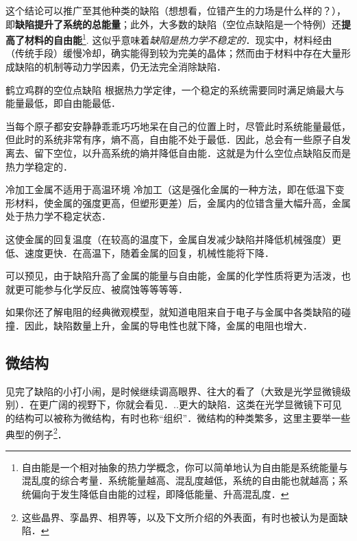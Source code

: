 这个结论可以推广至其他种类的缺陷（想想看，位错产生的力场是什么样的？），即\textbf{缺陷提升了系统的总能量}；此外，大多数的缺陷（空位点缺陷是一个特例）还\textbf{提高了材料的自由能}\footnote{自由能是一个相对抽象的热力学概念，你可以简单地认为自由能是系统能量与混乱度的综合考量．系统能量越高、混乱度越低，系统的自由能也就越高；系统偏向于发生降低自由能的过程，即降低能量、升高混乱度．}. 这似乎意味着\textsl{缺陷是热力学不稳定的}．现实中，材料经由（传统手段）缓慢冷却，确实能得到较为完美的晶体；然而由于材料中存在大量形成缺陷的机制等动力学因素，仍无法完全消除缺陷．

\begin{example}{鹤立鸡群的空位点缺陷}
根据热力学定律，一个稳定的系统需要同时满足熵最大与能量最低，即自由能最低．

当每个原子都安安静静乖乖巧巧地呆在自己的位置上时，尽管此时系统能量最低，但此时的系统非常有序，熵不高，自由能不处于最低．因此，总会有一些原子自发离去、留下空位，以升高系统的熵并降低自由能．这就是为什么空位点缺陷反而是热力学稳定的．
\end{example}

\begin{example}{冷加工金属不适用于高温环境}
冷加工（这是强化金属的一种方法，即在低温下变形材料，使金属的强度更高，但塑形更差）后，金属内的位错含量大幅升高，金属处于热力学不稳定状态．

这使金属的回复温度（在较高的温度下，金属自发减少缺陷并降低机械强度）更低、速度更快．在高温下，随着金属的回复，机械性能将下降．
\end{example}

可以预见，由于缺陷升高了金属的能量与自由能，金属的化学性质将更为活泼，也就更可能参与化学反应、被腐蚀等等等等．

如果你还了解电阻的经典微观模型，就知道电阻来自于电子与金属中各类缺陷的碰撞．因此，缺陷数量上升，金属的导电性也就下降，金属的电阻也增大．

\subsection{微结构}
见完了缺陷的小打小闹，是时候继续调高眼界、往大的看了（大致是光学显微镜级别）．在更广阔的视野下，你就会看见．..更大的缺陷．这类在光学显微镜下可见的结构可以被称为微结构，有时也称“组织”．微结构的种类繁多，这里主要举一些典型的例子\footnote{这些晶界、孪晶界、相界等，以及下文所介绍的外表面，有时也被认为是面缺陷．}．

